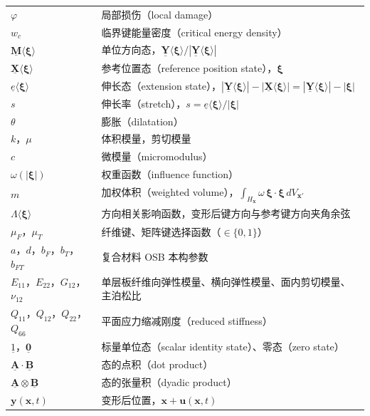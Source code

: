 \begin{longtable}{@{}p{4.8cm}>{\raggedright\arraybackslash}p{10.2cm}@{}}
  $\varphi$ & 局部损伤（local damage） \\
  $w_{c}$ & 临界键能量密度（critical energy density） \\
  $\underline{\mathbf{M}}\langle\boldsymbol{\xi}\rangle$ & 单位方向态，$\underline{\mathbf{Y}}\langle\boldsymbol{\xi}\rangle/|\underline{\mathbf{Y}}\langle\boldsymbol{\xi}\rangle|$ \\
  $\underline{\mathbf{X}}\langle\boldsymbol{\xi}\rangle$ & 参考位置态（reference position state），$\boldsymbol{\xi}$ \\
  $\underline{e}\langle\boldsymbol{\xi}\rangle$ & 伸长态（extension state），$|\underline{\mathbf{Y}}\langle\boldsymbol{\xi}\rangle|-|\underline{\mathbf{X}}\langle\boldsymbol{\xi}\rangle|=|\underline{\mathbf{Y}}\langle\boldsymbol{\xi}\rangle|-|\boldsymbol{\xi}|$ \\
  $s$ & 伸长率（stretch），$s=\underline{e}\langle\boldsymbol{\xi}\rangle/|\boldsymbol{\xi}|$ \\
  $\theta$ & 膨胀（dilatation） \\
  $k$，$\mu$ & 体积模量，剪切模量 \\
  $c$ & 微模量（micromodulus） \\
  $\omega(|\boldsymbol{\xi}|)$ & 权重函数（influence function） \\
  $m$ & 加权体积（weighted volume），$\displaystyle\int_{H_{\mathbf{x}}}\omega\,\boldsymbol{\xi}\cdot\boldsymbol{\xi}\,dV_{\mathbf{x}'}$ \\
  $\Lambda\langle\boldsymbol{\xi}\rangle$ & 方向相关影响函数，变形后键方向与参考键方向夹角余弦 \\
  $\mu_{F}$，$\mu_{T}$ & 纤维键、矩阵键选择函数（$\in\{0,1\}$） \\
  $a$，$d$，$b_{F}$，$b_{T}$，$b_{FT}$ & 复合材料 OSB 本构参数 \\
  $E_{11}$，$E_{22}$，$G_{12}$，$\nu_{12}$ & 单层板纤维向弹性模量、横向弹性模量、面内剪切模量、主泊松比 \\
  $Q_{11}$，$Q_{12}$，$Q_{22}$，$Q_{66}$ & 平面应力缩减刚度（reduced stiffness） \\
  $\underline{1}$，$\underline{\mathbf{0}}$ & 标量单位态（scalar identity state）、零态（zero state） \\
  $\underline{\mathbf{A}}\cdot\underline{\mathbf{B}}$ & 态的点积（dot product） \\
  $\underline{\mathbf{A}}\otimes\underline{\mathbf{B}}$ & 态的张量积（dyadic product） \\
  $\mathbf{y}(\mathbf{x},t)$ & 变形后位置，$\mathbf{x}+\mathbf{u}(\mathbf{x},t)$ \\

\end{longtable}
